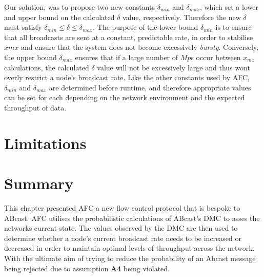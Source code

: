     Our solution, was to propose two new constants $\delta_{min}$ and $\delta_{max}$, which set a lower and upper bound on the calculated $\delta$ value, respectively.  Therefore the new $\delta$ must satisfy $\delta_{min} \leq \delta \leq \delta_{max}$.  The purpose of the lower bound $\delta_{min}$ is to ensure that all broadcasts are sent at a constant, predictable rate, in order to stabilise $x{mx}$ and ensure that the system does not become excessively \emph{bursty}.  Conversely, the upper bound $\delta_{max}$ ensures that if a large number of $Mp$s occur between $x_{mx}$ calculations, the calculated $\delta$ value will not be excessively large and thus wont overly restrict a node's broadcast rate.  Like the other constants used by AFC, $\delta_{min}$ and $\delta_{max}$ are determined before runtime, and therefore appropriate values can be set for each depending on the network environment and the expected throughput of data. 
    
    
\section{Limitations}

\section{Summary}
This chapter presented AFC a new flow control protocol that is bespoke to \textsf{ABcast}.  AFC utilises the probabilistic calculations of \textsf{ABcast}'s DMC to asses the networks current state.  The values observed by the DMC are then used to determine whether a node's current broadcast rate needs to be increased or decreased in order to maintain optimal levels of throughput across the network.  With the ultimate aim of trying to reduce the probability of an \textsf{Abcast} message being rejected due to assumption \textbf{A4} being violated.    